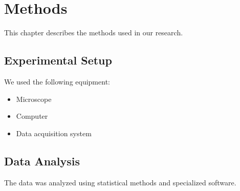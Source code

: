 \section{Methods}

This chapter describes the methods used in our research.

\subsection{Experimental Setup}

We used the following equipment:
\begin{itemize}
\item Microscope
\item Computer
\item Data acquisition system
\end{itemize}

\subsection{Data Analysis}

The data was analyzed using statistical methods and specialized software.

